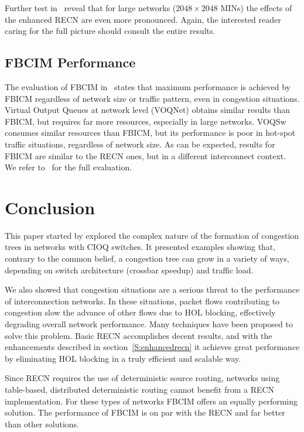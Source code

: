 Further test in~\cite{paper2} reveal that for large networks (${2048 \times 2048}$ MINs) the effects of the enhanced RECN are even more pronounced. Again, the interested reader caring for the full picture should consult the entire results.

\subsection{FBCIM Performance}\label{S:fbcim_perf}

The evaluation of FBCIM in~\cite{paper3} states that maximum performance is achieved by FBICM regardless of network size or traffic pattern, even in congestion situations. Virtual Output Queues at network level (VOQNet) obtains similar results than FBICM, but requires far more resources, especially in large networks. VOQSw consumes similar resources than FBICM, but its performance is poor in hot-spot traffic situations, regardless of network size. As can be expected, results for FBICM are similar to the RECN ones, but in a different interconnect context. We refer to~\cite{paper3} for the full evaluation.

\section{Conclusion}\label{S:conclusion}

This paper started by explored the complex nature of the formation of congestion trees in networks with CIOQ switches. It presented examples showing that, contrary to the common belief, a congestion tree can grow in a variety of ways, depending on switch architecture (crossbar speedup) and traffic load. 

We also showed that congestion situations are a serious threat to the performance of interconnection networks. In these situations, packet flows contributing to congestion slow the advance of other flows due to HOL blocking, effectively degrading overall network performance. Many techniques have been proposed to solve this problem. Basic RECN accomplishes decent results, and with the enhancements described in section~\ref{S:enhancedrecn} it achieves great performance by eliminating HOL blocking in a truly efficient and scalable way. 

Since RECN requires the use of deterministic source routing, networks using table-based, distributed deterministic routing cannot benefit from a RECN implementation. For these types of networks FBCIM offers an equally performing solution. The performance of FBCIM is on par with the RECN and far better than other solutions. 

